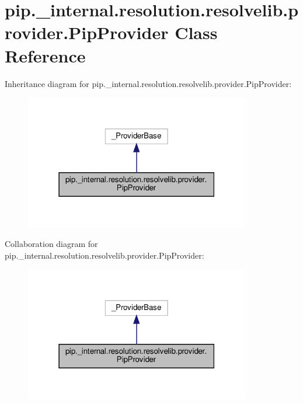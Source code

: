 \hypertarget{classpip_1_1__internal_1_1resolution_1_1resolvelib_1_1provider_1_1PipProvider}{}\section{pip.\+\_\+internal.\+resolution.\+resolvelib.\+provider.\+Pip\+Provider Class Reference}
\label{classpip_1_1__internal_1_1resolution_1_1resolvelib_1_1provider_1_1PipProvider}


Inheritance diagram for pip.\+\_\+internal.\+resolution.\+resolvelib.\+provider.\+Pip\+Provider\+:
\nopagebreak
\begin{figure}[H]
\begin{center}
\leavevmode
\includegraphics[width=279pt]{classpip_1_1__internal_1_1resolution_1_1resolvelib_1_1provider_1_1PipProvider__inherit__graph}
\end{center}
\end{figure}


Collaboration diagram for pip.\+\_\+internal.\+resolution.\+resolvelib.\+provider.\+Pip\+Provider\+:
\nopagebreak
\begin{figure}[H]
\begin{center}
\leavevmode
\includegraphics[width=279pt]{classpip_1_1__internal_1_1resolution_1_1resolvelib_1_1provider_1_1PipProvider__coll__graph}
\end{center}
\end{figure}
